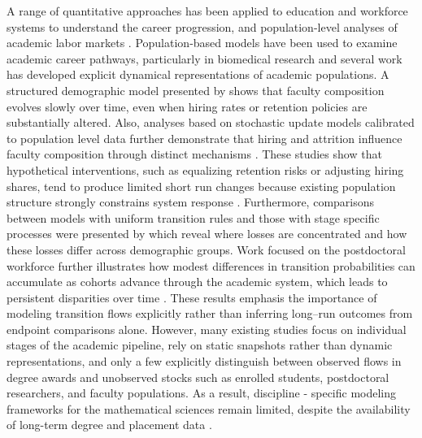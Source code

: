 \documentclass[3p]{elsarticle}%
\theoremstyle{definition}
\begin{document}
 \noindent A range of quantitative approaches has been applied to education and workforce systems to understand the career progression, and population-level analyses of academic labor markets \cite{larson2014too,ghaffarzadegan2016education}. Population-based models have been used to examine academic career pathways, particularly in biomedical research \cite{ghaffarzadegan2015note, b4} and several work has developed explicit dynamical representations of academic populations. A structured demographic model presented by \cite{MarschkeEtAl2007} shows that faculty composition evolves slowly over time, even when hiring rates or retention policies are substantially altered. Also, analyses based on stochastic update models calibrated to population level data further demonstrate that hiring and attrition influence faculty composition through distinct mechanisms \cite{LaBergeEtAl2024, b2}. These studies show that hypothetical interventions, such as equalizing retention risks or adjusting hiring shares, tend to produce limited short run changes because existing population structure strongly constrains system response \cite{LaBergeEtAl2024}. Furthermore, comparisons between models with uniform transition rules and those with stage specific processes were presented by \cite{ShawStanton2012,ShawEtAl2021} which reveal where losses are concentrated and how these losses differ across demographic groups. Work focused on the postdoctoral workforce further illustrates how modest differences in transition probabilities can accumulate as cohorts advance through the academic system, which leads to persistent disparities over time \cite{GhaffarzadeganHawleyDesai2014}. These results emphasis the importance of modeling transition flows explicitly rather than inferring long--run outcomes from endpoint comparisons alone. However, many existing studies focus on individual stages of the academic pipeline, rely on static snapshots rather than dynamic representations, and only a few explicitly distinguish between observed flows in degree awards and unobserved stocks such as enrolled students, postdoctoral researchers, and faculty populations. As a result, discipline - specific modeling frameworks for the mathematical sciences remain limited, despite the availability of long-term degree and placement data \cite{cleary20102009,topaz2026dynamicalmodelusmathematics}.\\ 
 
\end{document}
